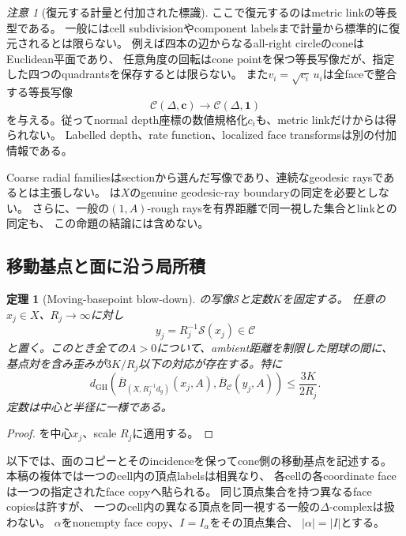 \documentclass[11pt,a4paper]{ltjsarticle}
\newcommand{\GH}{\operatorname{GH}}
\newcommand{\cC}{\mathcal C}
\newcommand{\cS}{\mathcal S}
\newcommand{\ov}{\overline}
\theoremstyle{plain}
\newtheorem{theorem}{定理}[section]
\theoremstyle{definition}
\theoremstyle{remark}
\newtheorem{remark}[remark]{注意}
\begin{document}
\begin{remark}[復元する計量と付加された標識]
\label{rem:link-metric-scope}
ここで復元するのはmetric linkの等長型である。
一般にはcell subdivisionやcomponent labelsまで計量から標準的に復元されるとは限らない。
例えば四本の辺からなるall-right circleのconeはEuclidean平面であり、
任意角度の回転はcone pointを保つ等長写像だが、指定した四つのquadrantsを保存するとは限らない。
また$v_i=\sqrt{c_i}\,u_i$は全faceで整合する等長写像
\[
 \cC(\Delta,\bm c)\longrightarrow\cC(\Delta,\bm1)
\]
を与える。従ってnormal depth座標の数値規格化$c_i$も、metric linkだけからは得られない。
Labelled depth、rate function、localized face transformsは別の付加情報である。

Coarse radial familiesはsectionから選んだ写像であり、連続なgeodesic raysであるとは主張しない。
は$X$のgenuine geodesic-ray boundaryの同定を必要としない。
さらに、一般の$(1,A)$-rough raysを有界距離で同一視した集合とlinkとの同定も、
この命題の結論には含めない。
\end{remark}

\subsection{移動基点と面に沿う局所積}

\begin{theorem}[Moving-basepoint blow-down]
\label{thm:moving}
の写像$\cS$と定数$K$を固定する。
任意の$x_j\in X$、$R_j\to\infty$に対し
\[
 y_j=R_j^{-1}\cS(x_j)\in\cC
\]
と置く。このとき全ての$A>0$について、ambient距離を制限した閉球の間に、
基点対を含み歪みが$3K/R_j$以下の対応が存在する。特に
\[
 d_{\GH}\!\left(
 \ov B_{(X,R_j^{-1}d_g)}(x_j,A),
 \ov B_\cC(y_j,A)
 \right)\le\frac{3K}{2R_j}.
\]
定数は中心と半径に一様である。
\end{theorem}
\begin{proof}
を中心$x_j$、scale $R_j$に適用する。
\end{proof}

以下では、面のコピーとそのincidenceを保ってcone側の移動基点を記述する。
本稿の複体では一つのcell内の頂点labelsは相異なり、
各cellの各coordinate faceは一つの指定されたface copyへ貼られる。
同じ頂点集合を持つ異なるface copiesは許すが、
一つのcell内の異なる頂点を同一視する一般の$\Delta$-complexは扱わない。
$\alpha$をnonempty face copy、$I=I_\alpha$をその頂点集合、
$|\alpha|=|I|$とする。
\end{document}
